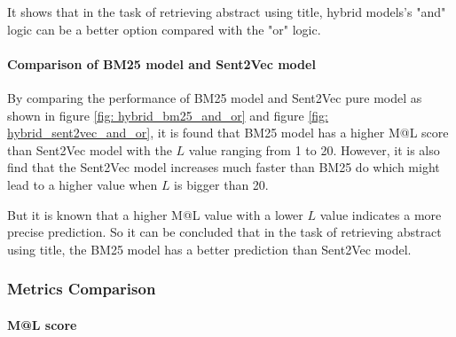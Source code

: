 \documentclass[10pt,a4paper,fleqn]{report}
\begin{document}
				It shows that in the task of retrieving abstract using title, hybrid models's "and" logic can be a better option compared with the "or" logic.
				
				\paragraph{Comparison of BM25 model and Sent2Vec model}
				By comparing the performance of BM25 model and Sent2Vec pure model as shown in figure \ref{fig: hybrid_bm25_and_or} and figure \ref{fig: hybrid_sent2vec_and_or}, it is found that BM25 model has a higher M@L score than Sent2Vec model with the $L$ value ranging from 1 to 20.				
				However, it is also find that the Sent2Vec model increases much faster than BM25 do which might lead to a higher value when $L$ is bigger than 20.
				
				But it is known that a higher M@L value with a lower $L$ value indicates a more precise prediction. 
				So it can be concluded that in the task of retrieving abstract using title, the BM25 model has a better prediction than Sent2Vec model.
			\subsubsection{Metrics Comparison}
				\paragraph{M@L score}
					
\end{document}
